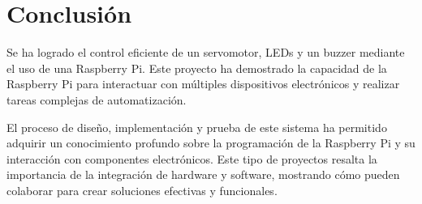 \section{Conclusión}

Se ha logrado el control eficiente de un servomotor, LEDs y un buzzer mediante el uso de una Raspberry Pi. Este proyecto ha demostrado la capacidad de la Raspberry Pi para interactuar con múltiples dispositivos electrónicos y realizar tareas complejas de automatización.

El proceso de diseño, implementación y prueba de este sistema ha permitido adquirir un conocimiento profundo sobre la programación de la Raspberry Pi y su interacción con componentes electrónicos. Este tipo de proyectos resalta la importancia de la integración de hardware y software, mostrando cómo pueden colaborar para crear soluciones efectivas y funcionales.